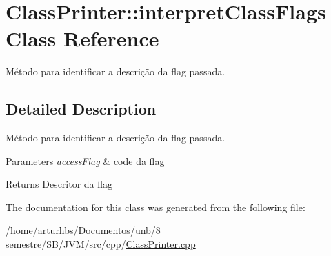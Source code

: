 \hypertarget{classClassPrinter_1_1interpretClassFlags}{}\section{Class\+Printer\+:\+:interpret\+Class\+Flags Class Reference}
\label{classClassPrinter_1_1interpretClassFlags}


Método para identificar a descrição da flag passada.  




\subsection{Detailed Description}
Método para identificar a descrição da flag passada. 


\begin{DoxyParams}{Parameters}
{\em access\+Flag} & code da flag \\
\hline
\end{DoxyParams}
\begin{DoxyReturn}{Returns}
Descritor da flag 
\end{DoxyReturn}


The documentation for this class was generated from the following file\+:\begin{DoxyCompactItemize}
\item 
/home/arturhbs/\+Documentos/unb/8 semestre/\+S\+B/\+J\+V\+M/src/cpp/\hyperlink{ClassPrinter_8cpp}{Class\+Printer.\+cpp}\end{DoxyCompactItemize}
